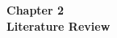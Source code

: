 \begin{center}

    \thispagestyle{empty}
    \vspace*{\fill}
    
    \Huge 
    \textbf{Chapter 2\\  Literature Review}
       

    \vspace*{\fill}
\end{center}